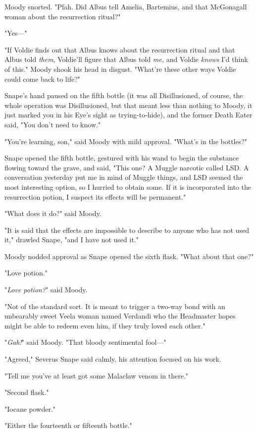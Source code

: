 Moody snorted. "Pfah. Did Albus tell Amelia, Bartemius, and that McGonagall 
woman about the resurrection ritual?"

"Yes---"

"If Voldie finds out that Albus knows about the resurrection ritual and that 
Albus told \emph{them}, Voldie'll figure that Albus told \emph{me,} and Voldie 
\emph{knows} I'd think of this." Moody shook his head in disgust. "What're 
these other ways Voldie could come back to life?"

Snape's hand paused on the fifth bottle (it was all Disillusioned, of course, 
the whole operation was Disillusioned, but that meant less than nothing to 
Moody, it just marked you in his Eye's sight as trying-to-hide), and the former 
Death Eater said, "You don't need to know."

"You're learning, son," said Moody with mild approval. "What's in the bottles?"

Snape opened the fifth bottle, gestured with his wand to begin the substance 
flowing toward the grave, and said, "This one? A Muggle narcotic called LSD. A 
conversation yesterday put me in mind of Muggle things, and LSD seemed the most 
interesting option, so I hurried to obtain some. If it is incorporated into the 
resurrection potion, I suspect its effects will be permanent."

"What does it do?" said Moody.

"It is said that the effects are impossible to describe to anyone who has not 
used it," drawled Snape, "and I have not used it."

Moody nodded approval as Snape opened the sixth flask. "What about that one?"

"Love potion."

"\emph{Love potion?}" said Moody.

"Not of the standard sort. It is meant to trigger a two-way bond with an 
unbearably sweet Veela woman named Verdandi who the Headmaster hopes might be 
able to redeem even him, if they truly loved each other."

"\emph{Gah!}" said Moody. "That bloody sentimental fool---"

"Agreed," Severus Snape said calmly, his attention focused on his work.

"Tell me you've at least got some Malaclaw venom in there."

"Second flask."

"Iocane powder."

"Either the fourteenth or fifteenth bottle."

